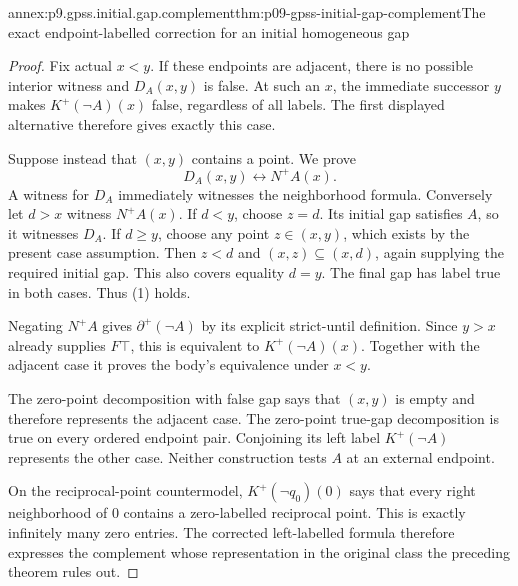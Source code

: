 \begin{annexitem}{annex:p9.gpss.initial.gap.complement}{thm:p09-gpss-initial-gap-complement}{The exact endpoint-labelled correction for an initial homogeneous gap}
\begin{proof}
Fix actual \(x<y\). If these endpoints are adjacent,
there is no possible interior witness and \(D_A(x,y)\)
is false. At such an \(x\), the immediate successor
\(y\) makes \(K^+(\neg A)(x)\) false, regardless
of all labels. The first displayed alternative
therefore gives exactly this case.

Suppose instead that \((x,y)\) contains a point.
We prove
\[
                       D_A(x,y)\longleftrightarrow N^+A(x).
 \tag{1}
\]
A witness for \(D_A\) immediately witnesses
the neighborhood formula. Conversely let \(d>x\)
witness \(N^+A(x)\). If \(d<y\), choose \(z=d\).
Its initial gap satisfies \(A\), so it witnesses
\(D_A\). If \(d\geq y\), choose any point
\(z\in(x,y)\), which exists by the present case
assumption. Then \(z<d\) and
\((x,z)\subseteq(x,d)\), again supplying the
required initial gap. This also covers equality
\(d=y\). The final gap has label true in both cases.
Thus (1) holds.

Negating \(N^+A\) gives
\(\partial^+(\neg A)\) by its explicit
strict-until definition. Since \(y>x\)
already supplies \(F\top\), this is
equivalent to \(K^+(\neg A)(x)\).
Together with the adjacent case it proves
the body's equivalence under \(x<y\).

The zero-point decomposition with false
gap says that \((x,y)\) is empty and
therefore represents the adjacent case.
The zero-point true-gap decomposition
is true on every ordered endpoint pair.
Conjoining its left label
\(K^+(\neg A)\) represents the other
case. Neither construction tests
\(A\) at an external endpoint.

On the reciprocal-point countermodel,
\(K^+(\neg q_0)(0)\) says that
every right neighborhood of 0
contains a zero-labelled reciprocal
point. This is exactly infinitely
many zero entries. The corrected
left-labelled formula therefore
expresses the complement whose
representation in the original
class the preceding theorem rules
out.
\end{proof}
\end{annexitem}
